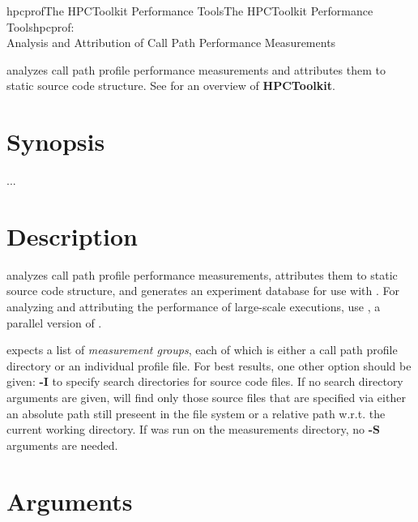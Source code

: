 \documentclass[english]{article}
\begin{document}
\begin{Name}{1}{hpcprof}{The HPCToolkit Performance Tools}{The HPCToolkit Performance Tools}{hpcprof:\\ Analysis and Attribution of Call Path Performance Measurements}

 analyzes call path profile performance measurements
and attributes them to static source code structure.
See  for an overview of \textbf{HPCToolkit}.

\end{Name}

\section{Synopsis}

  ...

\section{Description}

 analyzes call path profile performance measurements,
attributes them to static source code structure,
and generates an experiment database for use with .
For analyzing and attributing the performance of large-scale executions,
use , a parallel version of .

 expects a list of \emph{measurement groups},
each of which is either a call path profile directory or an individual profile file.
For best results, one other option should be given:
\textbf{-I} to specify search directories for source code files.
If no search directory arguments are given,
 will find only those source files that are specified via
either an absolute path still preseent in the file system
or a relative path w.r.t. the current working directory.
If {} was run on the measurements directory, no \textbf{-S} arguments are needed.


\section{Arguments}
\end{document}

